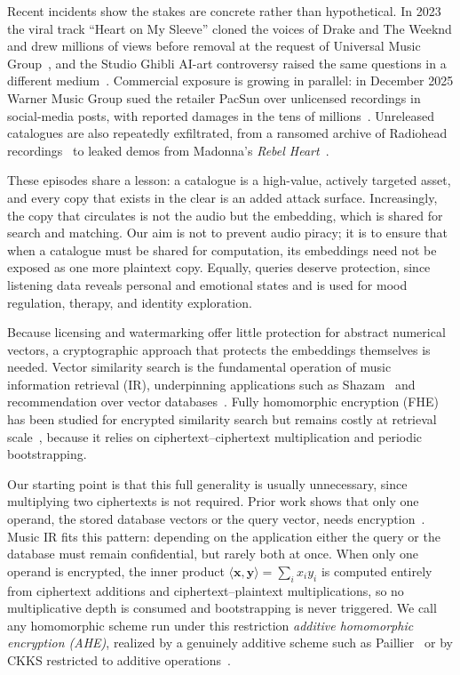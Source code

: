 \documentclass[sigconf,nonacm]{acmart}
\begin{document}
Recent incidents show the stakes are concrete rather than hypothetical. In 2023 the viral track ``Heart on My Sleeve'' cloned the voices of Drake and The Weeknd and drew millions of views before removal at the request of Universal Music Group~\cite{sisario2023ai}, and the Studio Ghibli AI-art controversy raised the same questions in a different medium~\cite{zhang2023ghibli}. Commercial exposure is growing in parallel: in December 2025 Warner Music Group sued the retailer PacSun over unlicensed recordings in social-media posts, with reported damages in the tens of millions~\cite{wmg_pacsun2025}. Unreleased catalogues are also repeatedly exfiltrated, from a ransomed archive of Radiohead recordings~\cite{radiohead_minidiscs2019} to leaked demos from Madonna's \emph{Rebel Heart}~\cite{madonna_rebelheart2015}.

These episodes share a lesson: a catalogue is a high-value, actively targeted asset, and every copy that exists in the clear is an added attack surface. Increasingly, the copy that circulates is not the audio but the embedding, which is shared for search and matching. Our aim is not to prevent audio piracy; it is to ensure that when a catalogue must be shared for computation, its embeddings need not be exposed as one more plaintext copy. Equally, queries deserve protection, since listening data reveals personal and emotional states and is used for mood regulation, therapy, and identity exploration.

Because licensing and watermarking offer little protection for abstract numerical vectors, a cryptographic approach that protects the embeddings themselves is needed. Vector similarity search is the fundamental operation of music information retrieval (IR), underpinning applications such as Shazam~\cite{hester2023shazam,shazam2003} and recommendation over vector databases~\cite{lynkz2024vector,solmaz_icict24,milvus2021}. Fully homomorphic encryption (FHE) has been studied for encrypted similarity search but remains costly at retrieval scale~\cite{cgentry_stoc09,cheon2017homomorphic}, because it relies on ciphertext--ciphertext multiplication and periodic bootstrapping.

Our starting point is that this full generality is usually unnecessary, since multiplying two ciphertexts is not required. Prior work shows that only one operand, the stored database vectors or the query vector, needs encryption~\cite{prism_sigmod21,otawose_sigmod23,secureknn2009,elmehdwi2014}. Music IR fits this pattern: depending on the application either the query or the database must remain confidential, but rarely both at once. When only one operand is encrypted, the inner product $\langle \mathbf{x},\mathbf{y}\rangle=\sum_i x_i y_i$ is computed entirely from ciphertext additions and ciphertext--plaintext multiplications, so no multiplicative depth is consumed and bootstrapping is never triggered. We call any homomorphic scheme run under this restriction \emph{additive homomorphic encryption (AHE)}, realized by a genuinely additive scheme such as Paillier~\cite{paillier1999} or by CKKS restricted to additive operations~\cite{cheon2017homomorphic}.
\end{document}
